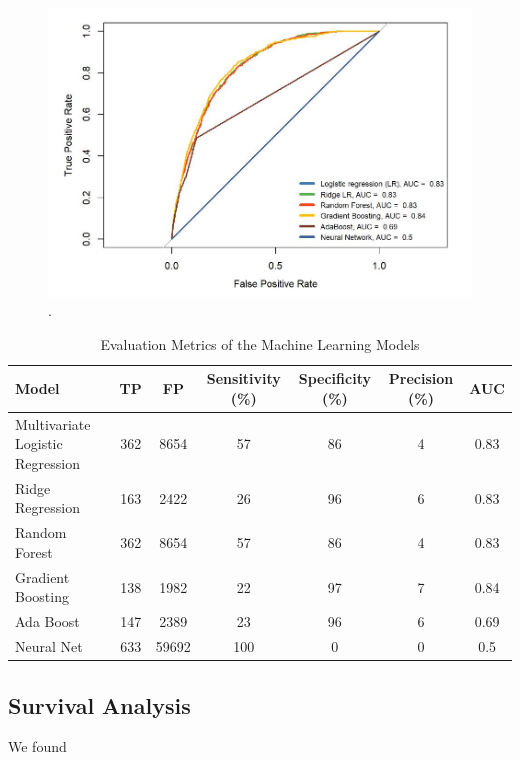 \documentclass[twoside,10.5pt]{article}
\begin{document}
\begin{figure}[htp]
\centering
\includegraphics[width=12cm]{images/auc_curves.JPG}
\caption{.}
\label{fig:auc_curves}
\end{figure}


\begin{table}[h!]
  \begin{center}
    \caption{Evaluation Metrics of the Machine Learning Models}
    \label{tab:metrics}
    \begin{tabular}{l|c|c|c|c|c|c}
      \textbf{Model} & \textbf{TP} & \textbf{FP} & \textbf{Sensitivity (\%)} & \textbf{Specificity (\%)} & \textbf{Precision (\%)} & \textbf{AUC}\\
      \hline
      Multivariate Logistic Regression & 362 & 8654 & 57 & 86 & 4 & 0.83\\
      Ridge Regression & 163 & 2422 & 26 & 96 & 6 & 0.83\\
      Random Forest & 362 & 8654 & 57 & 86 & 4 & 0.83\\
      Gradient Boosting & 138 & 1982 & 22 & 97 & 7 & 0.84\\
      Ada Boost & 147 & 2389 & 23 & 96 & 6 & 0.69\\
      Neural Net & 633 & 59692 & 100 & 0 & 0 & 0.5\\
      \hline
    \end{tabular}
  \end{center}
\end{table}

\newpage

\subsection{Survival Analysis}
We found
\end{document}
